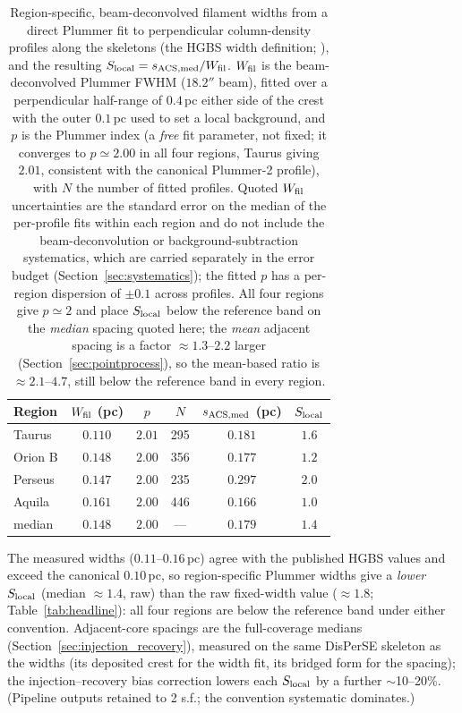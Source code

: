 \documentclass[usenatbib,twoside,twocolumn]{mnras}
\begin{document}
\begin{table}
\caption{Region-specific, beam-deconvolved filament widths from a direct Plummer fit to perpendicular column-density profiles along the skeletons (the HGBS width definition; \citealt{Arzoumanian2019}), and the resulting $S_{\rm local}=s_{\rm ACS,med}/W_{\rm fil}$. $W_{\rm fil}$ is the beam-deconvolved Plummer FWHM ($18.2''$ beam), fitted over a perpendicular half-range of $0.4$\,pc either side of the crest with the outer $0.1$\,pc used to set a local background, and $p$ is the Plummer index (a \emph{free} fit parameter, not fixed; it converges to $p\simeq2.00$ in all four regions, Taurus giving $2.01$, consistent with the canonical Plummer-2 profile), with $N$ the number of fitted profiles. Quoted $W_{\rm fil}$ uncertainties are the standard error on the median of the per-profile fits within each region and do not include the beam-deconvolution or background-subtraction systematics, which are carried separately in the error budget (Section~\ref{sec:systematics}); the fitted $p$ has a per-region dispersion of $\pm0.1$ across profiles. All four regions give $p\simeq2$ and place $S_{\rm local}$ below the reference band on the \emph{median} spacing quoted here; the \emph{mean} adjacent spacing is a factor $\approx1.3$--$2.2$ larger (Section~\ref{sec:pointprocess}), so the mean-based ratio is $\approx2.1$--$4.7$, still below the reference band in every region.}
\label{tab:widths}
\footnotesize
\setlength{\tabcolsep}{3pt}
\begin{tabular}{p{1.7cm}ccccc}
\toprule
Region & $W_{\rm fil}$ (pc) & $p$ & $N$ & $s_{\rm ACS,med}$ (pc) & $S_{\rm local}$ \\
\midrule
Taurus  & $0.110$ & $2.01$ & 295 & $0.181$ & $1.6$ \\
Orion B & $0.148$ & $2.00$ & 356 & $0.177$ & $1.2$ \\
Perseus & $0.147$ & $2.00$ & 235 & $0.297$ & $2.0$ \\
Aquila  & $0.161$ & $2.00$ & 446 & $0.166$ & $1.0$ \\
\midrule
median  & $0.148$ & $2.00$ & --- & $0.179$ & $1.4$ \\
\bottomrule
\end{tabular}
\par\vspace{2pt}
\footnotesize The measured widths ($0.11$--$0.16$\,pc) agree with the published HGBS values and exceed the canonical $0.10$\,pc, so region-specific Plummer widths give a \emph{lower} $S_{\rm local}$ (median $\approx1.4$, raw) than the raw fixed-width value ($\approx1.8$; Table~\ref{tab:headline}): all four regions are below the reference band under either convention. Adjacent-core spacings are the full-coverage medians (Section~\ref{sec:injection_recovery}), measured on the same DisPerSE skeleton as the widths (its deposited crest for the width fit, its bridged form for the spacing); the injection--recovery bias correction lowers each $S_{\rm local}$ by a further $\sim$10--20\%. (Pipeline outputs retained to 2 s.f.; the convention systematic dominates.)
\end{table}
\end{document}
